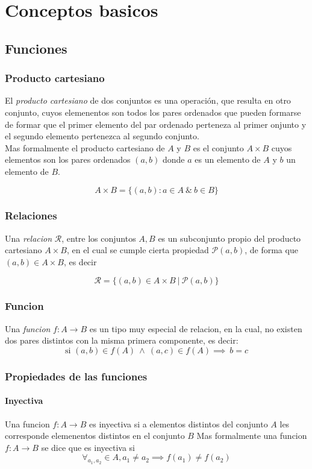 \section{Conceptos basicos}
\subsection{Funciones}
\subsubsection{Producto cartesiano}
El \textit{producto cartesiano} de dos conjuntos es una operación, que resulta
en otro conjunto, cuyos elemenentos son todos los pares ordenados que pueden
formarse de formar que el primer elemento del par ordenado perteneza al primer
onjunto y el segundo elemento pertenezca al segundo conjunto.\\

Mas formalmente el producto cartesiano de $A$ y $B$ es el conjunto $A \times B$
cuyos elementos son los pares ordenados $(a, b)$ donde $a$ es un elemento de $A$
y $b$ un elemento de $B$.

\[A \times B = \{(a, b): a \in A\ \&\ b \in B\}\]

\subsubsection{Relaciones}
Una \textit{relacion} $\mathcal{R}$, entre los conjuntos $A, B$ es un subconjunto
propio del producto cartesiano $A \times B$, en el cual se cumple cierta propiedad
$\mathcal{P}(a, b)$, de forma que $(a, b) \in A \times B$, es decir

\[\mathcal{R} = \{(a, b) \in A \times B\ |\ \mathcal{P}(a, b)\}\]

\subsubsection{Funcion}
Una \textit{funcion} $f : A \to B$ es un tipo muy especial de relacion, en la cual,
no existen dos pares distintos con la misma primera componente, es decir:
\[\text{si } (a, b) \in f(A)\ \land\ (a, c) \in f(A) \implies\ b = c\]

\subsubsection{Propiedades de las funciones}
\paragraph{Inyectiva}
Una funcion $f: A \to B$ es inyectiva si a elementos distintos del conjunto $A$ les
corresponde elemenentos distintos en el conjunto $B$
Mas formalmente una funcion $f: A \to B$ se dice que es inyectiva si
\[\forall_{a_1, a_2} \in A, a_1 \neq a_2 \implies f(a_1) \neq f(a_2)\]

